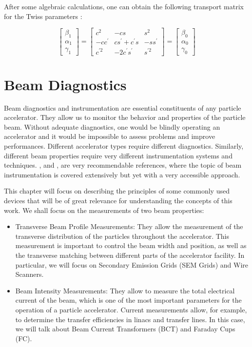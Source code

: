 After some algebraic calculations, one can obtain the following transport matrix for the Twiss parameters \parencite*[][]{ref:MatrixToTwiss}:

\begin{equation}
    \begin{bmatrix}
       \beta_1 \\ \alpha_1 \\ \gamma_1
    \end{bmatrix}
    =
\begin{bmatrix}
   c^2 & - c s & s^2 \\ -c c^{'} & cs^{'} + c^{'}s & -s s^{'} \\ c^{'2} & -2c^{'}s^{'} & s^{'2}
\end{bmatrix}
=
\begin{bmatrix}
   \beta_0 \\ \alpha_0 \\ \gamma_0
\end{bmatrix}
\label{eq:MatrixEq}
\end{equation}

\section{Beam Diagnostics}

Beam diagnostics and instrumentation are essential constituents of any particle accelerator. They allow us to monitor the behavior and properties of the particle beam. Without adequate diagnostics, one would be blindly operating an accelerator and it would be impossible to assess problems and improve performances. Different accelerator types require different diagnostics. Similarly, different beam properties require very different instrumentation systems and techniques.  \parencite*[][]{ref:BeamInstrumentationBook}, \parencite*[][]{ref:NotesBeamInst} and \parencite*[][]{ref:CASbeamInst}, are very recommendable references, where the topic of beam instrumentation is covered extensively but yet with a very accessible approach. 

This chapter will focus on describing the principles of some commonly used devices that will be of great relevance for understanding the concepts of this work. We shall focus on the measurements of two beam properties: 

\begin{itemize}
    \item Transverse Beam Profile Measurements: They allow the measurement of the transverse distribution of the particles throughout the accelerator. This measurement is important to control the beam width and position, as well as the transverse matching between different parts of the accelerator facility. In particular, we will focus on Secondary Emission Grids (SEM Grids) and Wire Scanners. 
    \item Beam Intensity Measurements: They allow to measure the total electrical current of the beam, which is one of the most important parameters for the operation of a particle accelerator. Current measurements allow, for example, to determine the transfer efficiencies in linacs and transfer lines. In this case, we will talk about Beam Current Transformers (BCT) and Faraday Cups (FC).
\end{itemize}



